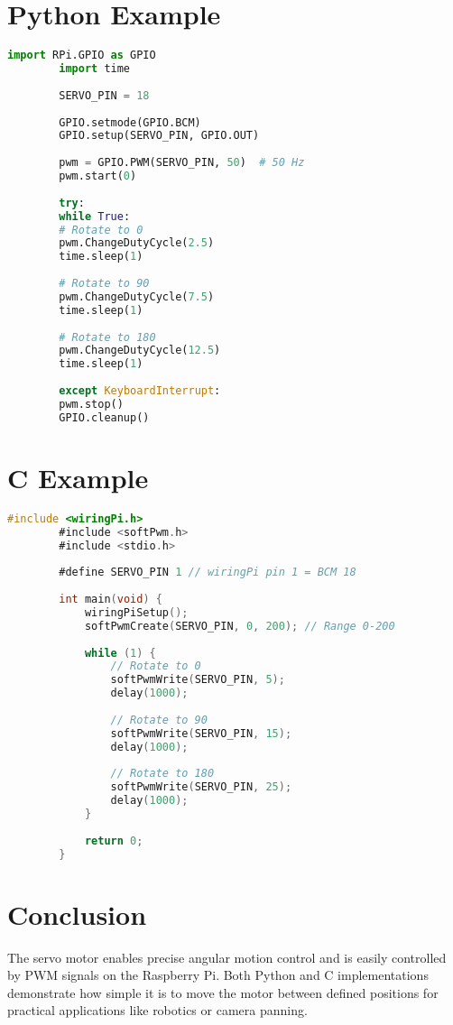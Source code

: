 \documentclass{article}
\begin{document}
	\section{Python Example}
	\begin{lstlisting}[language=Python]
		import RPi.GPIO as GPIO
		import time
		
		SERVO_PIN = 18
		
		GPIO.setmode(GPIO.BCM)
		GPIO.setup(SERVO_PIN, GPIO.OUT)
		
		pwm = GPIO.PWM(SERVO_PIN, 50)  # 50 Hz
		pwm.start(0)
		
		try:
		while True:
		# Rotate to 0
		pwm.ChangeDutyCycle(2.5)
		time.sleep(1)
		
		# Rotate to 90
		pwm.ChangeDutyCycle(7.5)
		time.sleep(1)
		
		# Rotate to 180
		pwm.ChangeDutyCycle(12.5)
		time.sleep(1)
		
		except KeyboardInterrupt:
		pwm.stop()
		GPIO.cleanup()
	\end{lstlisting}
	
	\section{C Example}
	\begin{lstlisting}[language=C]
		#include <wiringPi.h>
		#include <softPwm.h>
		#include <stdio.h>
		
		#define SERVO_PIN 1 // wiringPi pin 1 = BCM 18
		
		int main(void) {
			wiringPiSetup();
			softPwmCreate(SERVO_PIN, 0, 200); // Range 0-200
			
			while (1) {
				// Rotate to 0
				softPwmWrite(SERVO_PIN, 5);
				delay(1000);
				
				// Rotate to 90
				softPwmWrite(SERVO_PIN, 15);
				delay(1000);
				
				// Rotate to 180
				softPwmWrite(SERVO_PIN, 25);
				delay(1000);
			}
			
			return 0;
		}
	\end{lstlisting}
	
	\section{Conclusion}
	The servo motor enables precise angular motion control and is easily controlled by PWM signals on the Raspberry Pi. Both Python and C implementations demonstrate how simple it is to move the motor between defined positions for practical applications like robotics or camera panning.
	
	
	
 
\end{document}
